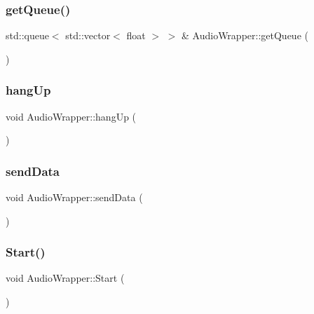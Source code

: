 \subsubsection{\texorpdfstring{get\+Queue()}{getQueue()}}
{\footnotesize\ttfamily std\+::queue$<$ std\+::vector$<$ float $>$ $>$ \& Audio\+Wrapper\+::get\+Queue (\begin{DoxyParamCaption}{ }\end{DoxyParamCaption})}

\mbox{\label{classAudioWrapper_ae17f31e4b187479c5b09c1d23a85a3d6}} 
\subsubsection{\texorpdfstring{hang\+Up}{hangUp}}
{\footnotesize\ttfamily void Audio\+Wrapper\+::hang\+Up (\begin{DoxyParamCaption}{ }\end{DoxyParamCaption})\hspace{0.3cm}{\ttfamily [signal]}}

\mbox{\label{classAudioWrapper_a8d77bd1e217129cfd8ec5ca25b16be04}} 
\subsubsection{\texorpdfstring{send\+Data}{sendData}}
{\footnotesize\ttfamily void Audio\+Wrapper\+::send\+Data (\begin{DoxyParamCaption}{ }\end{DoxyParamCaption})\hspace{0.3cm}{\ttfamily [slot]}}

\mbox{\label{classAudioWrapper_aaa9ffbddfceadb866955a41eb17ac744}} 
\subsubsection{\texorpdfstring{Start()}{Start()}}
{\footnotesize\ttfamily void Audio\+Wrapper\+::\+Start (\begin{DoxyParamCaption}{ }\end{DoxyParamCaption})}

